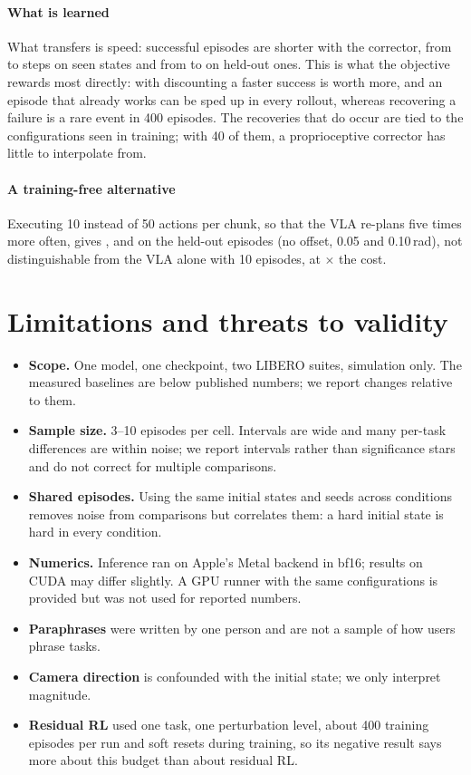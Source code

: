 \documentclass[10pt,twocolumn,letterpaper]{article}
\begin{document}
\paragraph{What is learned} What transfers is speed: successful episodes are shorter with the corrector,
from \RLStepsSeenVla{} to \RLStepsSeenRes{} steps on seen states and from \RLStepsUnseenVla{} to
\RLStepsUnseenRes{} on held-out ones. This is what the objective rewards most directly: with discounting a
faster success is worth more, and an episode that already works can be sped up in every rollout, whereas
recovering a failure is a rare event in 400 episodes. The recoveries that do occur are tied to the
configurations seen in training; with 40 of them, a proprioceptive corrector has little to interpolate from.

\paragraph{A training-free alternative} Executing 10 instead of 50 actions per chunk, so that the VLA
re-plans five times more often, gives \RLReplanClean{}, \RLReplanTrain{} and \RLReplanStrong{} on the
held-out episodes (no offset, 0.05 and 0.10\,rad), not distinguishable from the VLA alone with 10 episodes, at
\RLReplanSlowdown{}$\times$ the cost.

\section{Limitations and threats to validity}
\begin{itemize}
  \item \textbf{Scope.} One model, one checkpoint, two LIBERO suites, simulation only. The measured
  baselines are below published numbers; we report changes relative to them.
  \item \textbf{Sample size.} 3--10 episodes per cell. Intervals are wide and many per-task differences are
  within noise; we report intervals rather than significance stars and do not correct for multiple
  comparisons.
  \item \textbf{Shared episodes.} Using the same initial states and seeds across conditions removes noise
  from comparisons but correlates them: a hard initial state is hard in every condition.
  \item \textbf{Numerics.} Inference ran on Apple's Metal backend in bf16; results on CUDA may differ slightly.
  A GPU runner with the same configurations is provided but was not used for reported numbers.
  \item \textbf{Paraphrases} were written by one person and are not a sample of how users phrase tasks.
  \item \textbf{Camera direction} is confounded with the initial state; we only interpret magnitude.
  \item \textbf{Residual RL} used one task, one perturbation level, about 400 training episodes per run and
  soft resets during training, so its negative result says more about this budget than about residual RL.
\end{itemize}
\end{document}
